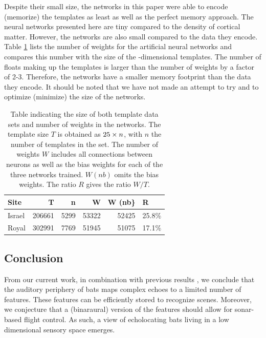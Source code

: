 \documentclass[preprint,5p]{elsarticle}
\begin{document}
Despite their small size, the networks in this paper were able to encode (memorize) the templates as least as well as the perfect memory approach. The neural networks presented here are tiny compared to the density of cortical matter. However, the networks are also small compared to the data they encode. Table \ref{tab:sizes} lists the number of weights for the artificial neural networks and compares this number with the size of the \pca-dimensional templates. The number of floats making up the templates is larger than the number of weights by a factor of 2-3. Therefore, the networks have a smaller memory footprint than the data they encode. It should be noted that we have not made an attempt to try and to optimize (minimize) the size of the networks.

\begin{table}
	\centering
\begin{tabular}{lrrrrl}
	\toprule
	Site &       T &     n &      W &  W (nb\} &      R \\
	\midrule
	Israel &  206661 &  5299 &  53322 &   52425 &  25.8\% \\
	Royal &  302991 &  7769 &  51945 &   51075 &  17.1\% \\
	\bottomrule
\end{tabular}
	\label{tab:sizes}
	\caption{Table indicating the size of both template data sets and number of weights in the networks. The template size $T$ is obtained as $25 \times n$, with $n$ the number of templates in the set. The number of weights $W$ includes all connections between neurons as well as the bias weights for each of the three networks trained. $W (nb)$ omits the bias weights. The ratio $R$ gives the ratio $W/T$.}
\end{table}


\subsection{Conclusion}

From our current work, in combination with previous results \citep{Vanderelst2016,Vanderelst2015a,Mansour2019}, we conclude that the auditory periphery of bats maps complex echoes to a limited number of features. These features can be efficiently stored to recognize scenes. Moreover, we conjecture that a (binaraural) version of the features should allow for sonar-based flight control. As such, a view of echolocating bats living in a low dimensional sensory space emerges.


\end{document}
